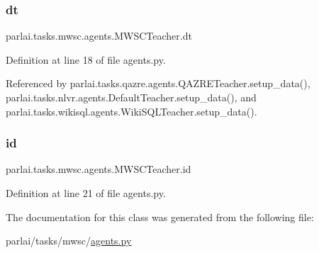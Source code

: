 \subsubsection{\texorpdfstring{dt}{dt}}
{\footnotesize\ttfamily parlai.\+tasks.\+mwsc.\+agents.\+M\+W\+S\+C\+Teacher.\+dt}



Definition at line 18 of file agents.\+py.



Referenced by parlai.\+tasks.\+qazre.\+agents.\+Q\+A\+Z\+R\+E\+Teacher.\+setup\+\_\+data(), parlai.\+tasks.\+nlvr.\+agents.\+Default\+Teacher.\+setup\+\_\+data(), and parlai.\+tasks.\+wikisql.\+agents.\+Wiki\+S\+Q\+L\+Teacher.\+setup\+\_\+data().

\mbox{\label{classparlai_1_1tasks_1_1mwsc_1_1agents_1_1MWSCTeacher_a4bbfd7511257248f090304a10eb43535}} 
\subsubsection{\texorpdfstring{id}{id}}
{\footnotesize\ttfamily parlai.\+tasks.\+mwsc.\+agents.\+M\+W\+S\+C\+Teacher.\+id}



Definition at line 21 of file agents.\+py.



The documentation for this class was generated from the following file\+:\begin{DoxyCompactItemize}
\item 
parlai/tasks/mwsc/\hyperlink{parlai_2tasks_2mwsc_2agents_8py}{agents.\+py}\end{DoxyCompactItemize}
